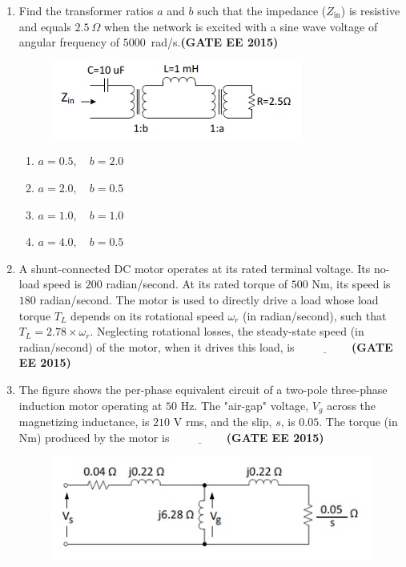 \documentclass[a4paper,12pt]{exam}
\theoremstyle{remark}
\begin{document}
\begin{enumerate}
\item Find the transformer ratios $a$ and $b$ such that the impedance ($Z_\text{in}$) is resistive and equals $2.5~\Omega$ when the network is excited with a sine wave voltage of angular frequency of $5000$~rad/s.\hfill{\textbf{(GATE EE 2015)}}
\begin{figure}[H]
    \centering
    \includegraphics[width=0.7\columnwidth]{figs/2Q 30.png}
    \caption{}
    \label{fig:placeholder}
\end{figure}

\begin{multicols}{2}
\begin{enumerate}
    \item $a = 0.5,\quad b = 2.0$
    \item $a = 2.0,\quad b = 0.5$
    \item $a = 1.0,\quad b = 1.0$
    \item $a = 4.0,\quad b = 0.5$
\end{enumerate}
\end{multicols}

\vspace{0.5cm}

\item A shunt-connected DC motor operates at its rated terminal voltage. Its no-load speed is $200$ radian/second. At its rated torque of $500$ Nm, its speed is $180$ radian/second. The motor is used to directly drive a load whose load torque $T_L$ depends on its rotational speed $\omega_r$ (in radian/second), such that $T_L = 2.78 \times \omega_r$. Neglecting rotational losses, the steady-state speed (in radian/second) of the motor, when it drives this load, is $\underline{\hspace{2cm}}$\hfill{\textbf{(GATE EE 2015)}}


\item The figure shows the per-phase equivalent circuit of a two-pole three-phase induction motor operating at $50$ Hz. The "air-gap" voltage, $V_g$ across the magnetizing inductance, is $210$ V rms, and the slip, $s$, is $0.05$. The torque (in Nm) produced by the motor is $\underline{\hspace{2cm}}$\hfill{\textbf{(GATE EE 2015)}}
\begin{figure}[H]
    \centering
    \includegraphics[width=0.75\columnwidth]{figs/2Q 32.png}
    \caption{}
    \label{fig:placeholder}
\end{figure}


\end{enumerate}
\end{document}
